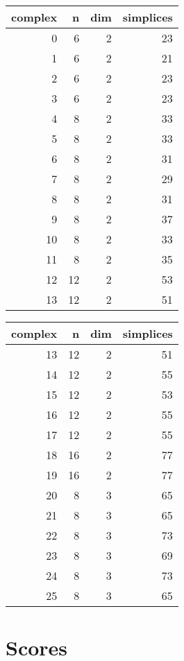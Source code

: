 \documentclass{article}
\begin{document}
\begin{tabular}{rrrr}
\toprule
complex & n & dim & simplices \\
\midrule
0 & 6 & 2 & 23 \\
1 & 6 & 2 & 21 \\
2 & 6 & 2 & 23 \\
3 & 6 & 2 & 23 \\
4 & 8 & 2 & 33 \\
5 & 8 & 2 & 33 \\
6 & 8 & 2 & 31 \\
7 & 8 & 2 & 29 \\
8 & 8 & 2 & 31 \\
9 & 8 & 2 & 37 \\
10 & 8 & 2 & 33 \\
11 & 8 & 2 & 35 \\
12 & 12 & 2 & 53 \\
13 & 12 & 2 & 51 \\
\bottomrule
\end{tabular}
\begin{tabular}{rrrr}
\toprule
complex & n & dim & simplices \\
\midrule
13 & 12 & 2 & 51 \\
14 & 12 & 2 & 55 \\
15 & 12 & 2 & 53 \\
16 & 12 & 2 & 55 \\
17 & 12 & 2 & 55 \\
18 & 16 & 2 & 77 \\
19 & 16 & 2 & 77 \\
20 & 8 & 3 & 65 \\
21 & 8 & 3 & 65 \\
22 & 8 & 3 & 73 \\
23 & 8 & 3 & 69 \\
24 & 8 & 3 & 73 \\
25 & 8 & 3 & 65 \\
\bottomrule
\end{tabular}



\section{Scores}
\end{document}
